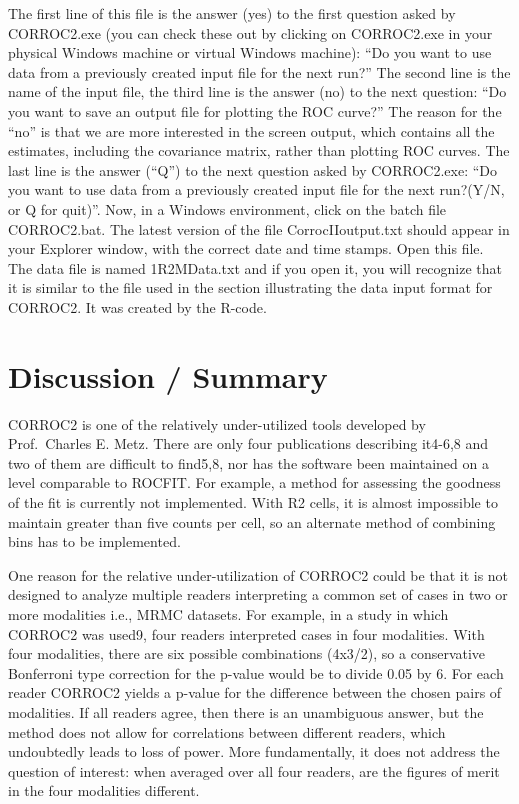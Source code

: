 \documentclass[
]{book}
\begin{document}
The first line of this file is the answer (yes) to the first question asked by CORROC2.exe (you can check these out by clicking on CORROC2.exe in your physical Windows machine or virtual Windows machine): ``Do you want to use data from a previously created input file for the next run?'' The second line is the name of the input file, the third line is the answer (no) to the next question: ``Do you want to save an output file for plotting the ROC curve?'' The reason for the ``no'' is that we are more interested in the screen output, which contains all the estimates, including the covariance matrix, rather than plotting ROC curves. The last line is the answer (``Q'') to the next question asked by CORROC2.exe: ``Do you want to use data from a previously created input file for the next run?(Y/N, or Q for quit)''. Now, in a Windows environment, click on the batch file CORROC2.bat. The latest version of the file CorrocIIoutput.txt should appear in your Explorer window, with the correct date and time stamps. Open this file. The data file is named 1R2MData.txt and if you open it, you will recognize that it is similar to the file used in the section illustrating the data input format for CORROC2. It was created by the R-code.

\hypertarget{bivariate-binormal-model-corroc2-discussion}{%
\section{Discussion / Summary}\label{bivariate-binormal-model-corroc2-discussion}}

CORROC2 is one of the relatively under-utilized tools developed by Prof.~Charles E. Metz. There are only four publications describing it4-6,8 and two of them are difficult to find5,8, nor has the software been maintained on a level comparable to ROCFIT. For example, a method for assessing the goodness of the fit is currently not implemented. With R2 cells, it is almost impossible to maintain greater than five counts per cell, so an alternate method of combining bins has to be implemented.

One reason for the relative under-utilization of CORROC2 could be that it is not designed to analyze multiple readers interpreting a common set of cases in two or more modalities i.e., MRMC datasets. For example, in a study in which CORROC2 was used9, four readers interpreted cases in four modalities. With four modalities, there are six possible combinations (4x3/2), so a conservative Bonferroni type correction for the p-value would be to divide 0.05 by 6. For each reader CORROC2 yields a p-value for the difference between the chosen pairs of modalities. If all readers agree, then there is an unambiguous answer, but the method does not allow for correlations between different readers, which undoubtedly leads to loss of power. More fundamentally, it does not address the question of interest: when averaged over all four readers, are the figures of merit in the four modalities different.
\end{document}
